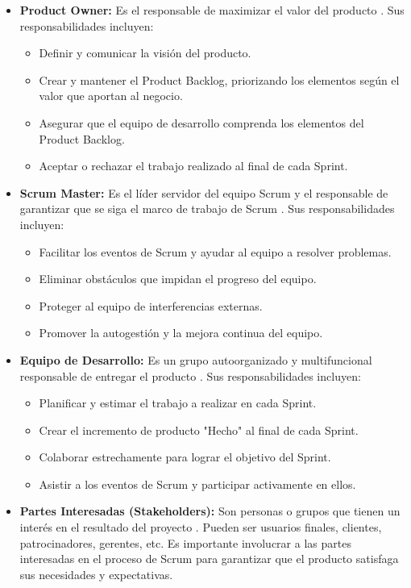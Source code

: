 \begin{itemize}
    \item \textbf{Product Owner:} Es el responsable de maximizar el valor del producto \autocite{cohn2010suceeding}. Sus responsabilidades incluyen:

    \begin{itemize}
        \item Definir y comunicar la visión del producto.
        \item Crear y mantener el Product Backlog, priorizando los elementos según el valor que aportan al negocio.
        \item Asegurar que el equipo de desarrollo comprenda los elementos del Product Backlog.
        \item Aceptar o rechazar el trabajo realizado al final de cada Sprint.
    \end{itemize}

    \item \textbf{Scrum Master:} Es el líder servidor del equipo Scrum y el responsable de garantizar que se siga el marco de trabajo de Scrum \autocite{rubin2012essential}. Sus responsabilidades incluyen:

    \begin{itemize}
        \item Facilitar los eventos de Scrum y ayudar al equipo a resolver problemas.
        \item Eliminar obstáculos que impidan el progreso del equipo.
        \item Proteger al equipo de interferencias externas.
        \item Promover la autogestión y la mejora continua del equipo.
    \end{itemize}

    \item \textbf{Equipo de Desarrollo:} Es un grupo autoorganizado y multifuncional responsable de entregar el producto \autocite{schwaber2020guia}. Sus responsabilidades incluyen:

    \begin{itemize}
        \item Planificar y estimar el trabajo a realizar en cada Sprint.
        \item Crear el incremento de producto "Hecho" al final de cada Sprint.
        \item Colaborar estrechamente para lograr el objetivo del Sprint.
        \item Asistir a los eventos de Scrum y participar activamente en ellos.
    \end{itemize}

    \item \textbf{Partes Interesadas (Stakeholders):} Son personas o grupos que tienen un interés en el resultado del proyecto \autocite{schwaber2020guia}. Pueden ser usuarios finales, clientes, patrocinadores, gerentes, etc. Es importante involucrar a las partes interesadas en el proceso de Scrum para garantizar que el producto satisfaga sus necesidades y expectativas.
\end{itemize}

